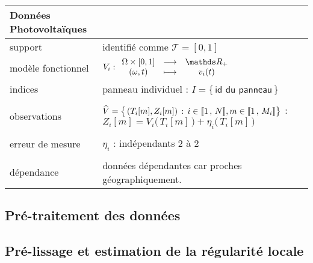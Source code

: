 \begin{tabularx}{\textwidth}{XX}
	\toprule
	\textbf{Données Photovoltaïques}                                                                                                                                                                                   \\
	\midrule
	support            & identifié comme $\mathcal T = [0,1]$                                                                                                                                                          \\
	modèle fonctionnel & ${V}_i : \func {\Omega \times [0,1]} {\mathds R_+} {(\omega, t)} {v_i(t)}$                                                                                                                    \\
	indices            & panneau individuel : $I = \bigl\{ \, \textsf{id du panneau} \,\bigr\}$                                                                                                                        \\
	\\
	observations       & $\widehat V = \bigl\{ \, (T_i[m], Z_i[m]) \, : \, i \in \llbracket 1 \, , \, N \rrbracket, m \in \llbracket 1 \, , \, M_i \rrbracket \bigr\}$ : $Z_i[m] = V_i\bigl( \, T_i[m] \, \bigr) + \eta_i\bigl( \, T_i[m] \, \bigr)$ \\
	\\
	erreur de mesure   & $\eta_i$ : indépendants 2 à 2                                                                                                                                                                 \\
	\\
	dépendance         & données dépendantes car proches géographiquement.                                                                                                                                             \\
	\bottomrule
\end{tabularx}


\subsection{Pré-traitement des données}

\subsection{Pré-lissage et estimation de la régularité locale}

